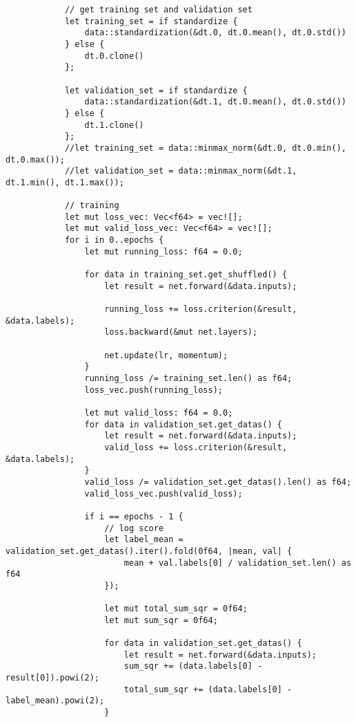 \begin{verbatim}
            // get training set and validation set
            let training_set = if standardize {
                data::standardization(&dt.0, dt.0.mean(), dt.0.std())
            } else {
                dt.0.clone()
            };
    
            let validation_set = if standardize {
                data::standardization(&dt.1, dt.0.mean(), dt.0.std())
            } else {
                dt.1.clone()
            };
            //let training_set = data::minmax_norm(&dt.0, dt.0.min(), dt.0.max());
            //let validation_set = data::minmax_norm(&dt.1, dt.1.min(), dt.1.max());
    
            // training
            let mut loss_vec: Vec<f64> = vec![];
            let mut valid_loss_vec: Vec<f64> = vec![];
            for i in 0..epochs {
                let mut running_loss: f64 = 0.0;
    
                for data in training_set.get_shuffled() {
                    let result = net.forward(&data.inputs);
    
                    running_loss += loss.criterion(&result, &data.labels);
                    loss.backward(&mut net.layers);
    
                    net.update(lr, momentum);
                }
                running_loss /= training_set.len() as f64;
                loss_vec.push(running_loss);
    
                let mut valid_loss: f64 = 0.0;
                for data in validation_set.get_datas() {
                    let result = net.forward(&data.inputs);
                    valid_loss += loss.criterion(&result, &data.labels);
                }
                valid_loss /= validation_set.get_datas().len() as f64;
                valid_loss_vec.push(valid_loss);
    
                if i == epochs - 1 {
                    // log score
                    let label_mean = validation_set.get_datas().iter().fold(0f64, |mean, val| {
                        mean + val.labels[0] / validation_set.len() as f64
                    });
    
                    let mut total_sum_sqr = 0f64;
                    let mut sum_sqr = 0f64;
    
                    for data in validation_set.get_datas() {
                        let result = net.forward(&data.inputs);
                        sum_sqr += (data.labels[0] - result[0]).powi(2);
                        total_sum_sqr += (data.labels[0] - label_mean).powi(2);
                    }
    

\end{verbatim}

